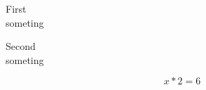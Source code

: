 \documentclass[12pt]{article}
\begin{document}
\begin{Corollaries}{}


    \begin{CorollariesItem}{}
        First\\
        someting
    \end{CorollariesItem}

    \begin{CorollariesItem}{}
        Second\\
        someting
    \end{CorollariesItem}

    \begin{CorollariesItem}{}
        \begin{tcbraster}[raster columns=3,raster halign=right]
            \centering
            \begin{tbox}[colorCorollaries][0cm][2pt][10]
                {\large $$ x * 2 = 6 $$}
            \end{tbox}
        \end{tcbraster}
    \end{CorollariesItem}

\end{Corollaries}


\newpage
\end{document}
